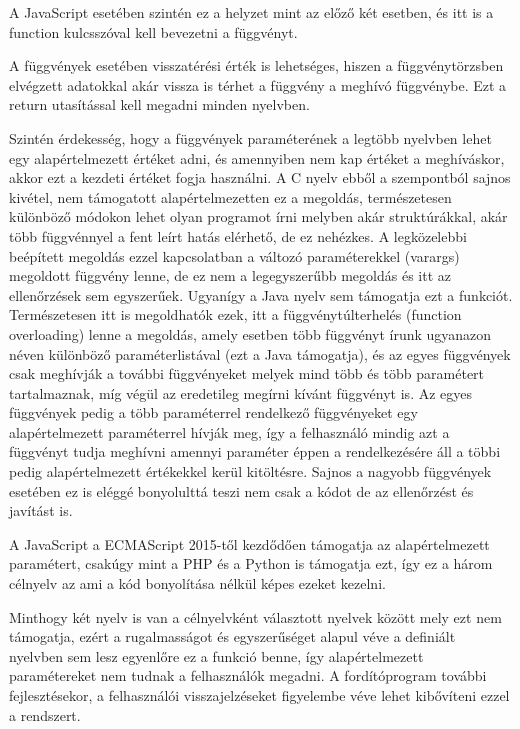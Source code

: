 A JavaScript esetében szintén ez a helyzet mint az előző két esetben, és itt is a function kulcsszóval kell bevezetni a függvényt.

A függvények esetében visszatérési érték is lehetséges, hiszen a függvénytörzsben elvégzett adatokkal akár vissza is térhet a függvény a meghívó függvénybe. Ezt a return utasítással kell megadni minden nyelvben.

Szintén érdekesség, hogy a függvények paraméterének a legtöbb nyelvben lehet egy alapértelmezett értéket adni, és amennyiben nem kap értéket a meghíváskor, akkor ezt a kezdeti értéket fogja használni.
A C nyelv ebből a szempontból sajnos kivétel, nem támogatott alapértelmezetten ez a megoldás, természetesen különböző módokon lehet olyan programot írni melyben akár struktúrákkal, akár több függvénnyel a fent leírt hatás elérhető, de ez nehézkes. A legközelebbi beépített megoldás ezzel kapcsolatban a változó paraméterekkel (varargs) megoldott függvény lenne, de ez nem a legegyszerűbb megoldás és itt az ellenőrzések sem egyszerűek.
Ugyanígy a Java nyelv sem támogatja ezt a funkciót. Természetesen itt is megoldhatók ezek, itt a függvénytúlterhelés (function overloading) lenne a megoldás, amely esetben több függvényt írunk ugyanazon néven különböző paraméterlistával (ezt a Java támogatja), és az egyes függvények csak meghívják a további függvényeket melyek mind több és több paramétert tartalmaznak, míg végül az eredetileg megírni kívánt függvényt is. Az egyes függvények pedig a több paraméterrel rendelkező függvényeket egy alapértelmezett paraméterrel hívják meg, így a felhasználó mindig azt a függvényt tudja meghívni amennyi paraméter éppen a rendelkezésére áll a többi pedig alapértelmezett értékekkel kerül kitöltésre. Sajnos a nagyobb függvények esetében ez is eléggé bonyolulttá teszi nem csak a kódot de az ellenőrzést és javítást is.

A JavaScript a ECMAScript 2015-től kezdődően támogatja az alapértelmezett paramétert, csakúgy mint a PHP és a Python is támogatja ezt, így ez a három célnyelv az ami a kód bonyolítása nélkül képes ezeket kezelni.

Minthogy két nyelv is van a célnyelvként választott nyelvek között mely ezt nem támogatja, ezért a rugalmasságot és egyszerűséget alapul véve a definiált nyelvben sem lesz egyenlőre ez a funkció benne, így alapértelmezett paramétereket nem tudnak a felhasználók megadni. A fordítóprogram további fejlesztésekor, a felhasználói visszajelzéseket figyelembe véve lehet kibővíteni ezzel a rendszert.


